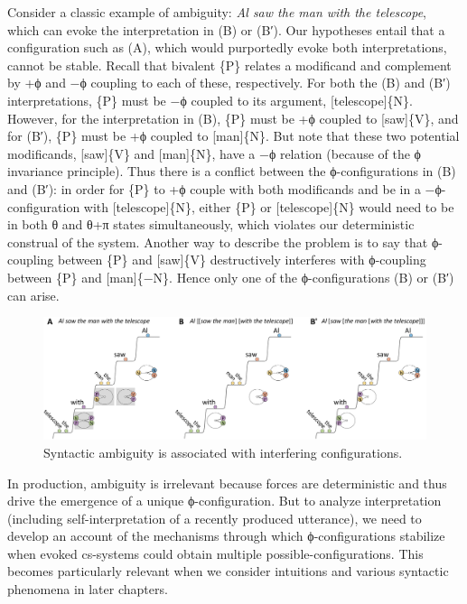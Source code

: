   Consider a classic example of ambiguity: \textit{Al saw the man with the telescope}, which can evoke the interpretation in {}(B) or (B′). Our  hypotheses entail that a configuration such as (A), which would purportedly evoke both interpretations, cannot be stable. Recall that bivalent \{P\} relates a modificand and complement by +ϕ and −ϕ coupling to each of these, respectively. For both the (B) and (B′) interpretations, \{P\} must be −ϕ coupled to its argument, [telescope]\{N\}. However, for the interpretation in (B), \{P\} must be +ϕ coupled to [saw]\{V\}, and for (B′), \{P\} must be +ϕ coupled to [man]\{N\}. But note that these two potential modificands, [saw]\{V\} and [man]\{N\}, have a −ϕ relation (because of the ϕ invariance principle). Thus there is a conflict between the ϕ-con\-fig\-u\-ra\-tions in (B) and (B′): in order for \{P\} to +ϕ couple with both modificands and be in a −ϕ-con\-fig\-u\-ra\-tion with [telescope]\{N\}, either \{P\} or [telescope]\{N\} would need to be in both θ and θ+π states simultaneously, which violates our deterministic construal of the system. Another way to describe the problem is to say that ϕ-coupling between \{P\} and [saw]\{V\} destructively interferes with ϕ-coupling between \{P\} and [man]\{−N\}. Hence only one of the ϕ-con\-fig\-u\-ra\-tions (B) or (B′) can arise.

  
\begin{figure}
\includegraphics[width=\textwidth]{figures/Tilsen-img89.png}
\caption{Syntactic ambiguity is associated with interfering configurations.}
\label{fig:4:39}
\end{figure}
 

  In production, ambiguity is irrelevant because  forces are deterministic and thus drive the emergence of a unique ϕ-con\-fig\-u\-ra\-tion. But to analyze interpretation (including self-interpretation of a recently produced utterance), we need to develop an account of the mechanisms through which ϕ-con\-fig\-u\-ra\-tions stabilize when evoked cs-systems could obtain multiple possible-con\-fig\-u\-ra\-tions. This becomes particularly relevant when we consider  intuitions and various syntactic phenomena in later chapters.

